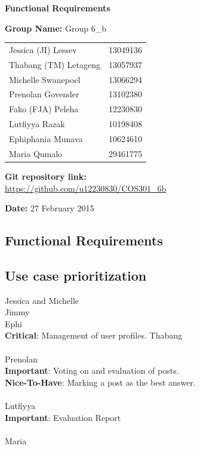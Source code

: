 \documentclass[a4paper,11pt]{article}
\begin{document}
\begin{center}

\LARGE\textbf{Functional Requirements\\}
																											
\vspace{2 cm}
\textbf{Group Name:} Group 6\_b\newline
 
\vspace{0.5 cm}
\begin{tabular}{lr}
Jessica (JI) Lessev&13049136\\
Thabang (TM) Letageng&13057937\\
Michelle Swanepoel&13066294\\
Prenolan Govender&13102380\\
Fako (FJA) Peleha&12230830\\
Lutfiyya Razak&10198408\\
Ephiphania Munava&10624610\\
Maria Qumalo&29461775\\
\end{tabular}

\vspace{1cm}
\textbf{Git repository link:\\}
\url{https://github.com/u12230830/COS301\_6b}

\vspace{1cm}
\textbf{Date:} 27 February 2015
\end{center}




\newpage

\begin{center}
\section{Functional Requirements}
\end{center}

\subsection{Use case prioritization}
Jessica and Michelle\\
Jimmy\\
Ephi\\
\textbf{Critical}: Management of user profiles.
Thabang\\
\\
Prenolan\\
\textbf{Important}: Voting on and evaluation of posts.
\\
\textbf{Nice-To-Have}: Marking a post as the best answer.
\\
\\
Lutfiyya\\
\textbf{Important}: Evaluation Report
\\
\\
Maria\\
\end{document}
